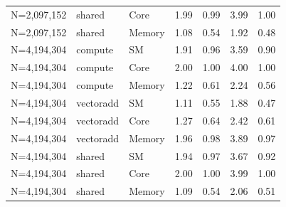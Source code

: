 \begin{tabular}{lllrrrr}
N=2,097,152 & shared & Core & 1.99 & 0.99 & 3.99 & 1.00 \\
N=2,097,152 & shared & Memory & 1.08 & 0.54 & 1.92 & 0.48 \\
\midrule
N=4,194,304 & compute & SM & 1.91 & 0.96 & 3.59 & 0.90 \\
N=4,194,304 & compute & Core & 2.00 & 1.00 & 4.00 & 1.00 \\
N=4,194,304 & compute & Memory & 1.22 & 0.61 & 2.24 & 0.56 \\
N=4,194,304 & vectoradd & SM & 1.11 & 0.55 & 1.88 & 0.47 \\
N=4,194,304 & vectoradd & Core & 1.27 & 0.64 & 2.42 & 0.61 \\
N=4,194,304 & vectoradd & Memory & 1.96 & 0.98 & 3.89 & 0.97 \\
N=4,194,304 & shared & SM & 1.94 & 0.97 & 3.67 & 0.92 \\
N=4,194,304 & shared & Core & 2.00 & 1.00 & 3.99 & 1.00 \\
N=4,194,304 & shared & Memory & 1.09 & 0.54 & 2.06 & 0.51 \\
\bottomrule
\end{tabular}

